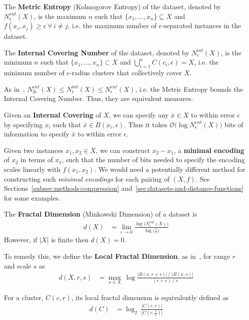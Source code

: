 The \textbf{Metric Entropy} (Kolmogorov Entropy) of the dataset, denoted by $N_{\epsilon}^{ent}(X)$, is the maximum $n$ such that $\{x_1, \dots, x_n\} \subseteq X$ and $f(x_i, x_j) \geq \epsilon \ \forall \ i \neq j$, i.e. the maximum number of $\epsilon$-separated instances in the dataset.

The \textbf{Internal Covering Number} of the dataset, denoted by $N_{\epsilon}^{int}(X)$, is the minimum $n$ such that $\{x_1, \dots, x_n\} \subset X$ and $\bigcup_{i = 1}^{n} C(c_i, \epsilon) = X$, i.e. the minimum number of $\epsilon$-radius clusters that collectively cover $X$.

As in~\cite{berger2020levenshtein}, $N_{2\epsilon}^{ent}(X) \leq N_{\epsilon}^{int}(X) \leq N_{\epsilon}^{ent}(X)$, i.e. the Metric Entropy bounds the Internal Covering Number.
Thus, they are equivalent measures.

Given an \textbf{Internal Covering} of $X$, we can specify any $\bar{x} \in X$ to within error $\epsilon$ by specifying $x_i$ such that $\bar{x} \in B(x_i, \epsilon)$.
Thus it takes $\mathcal{O} \big( \log N_{\epsilon}^{ent}(X) \big)$ bits of information to specify $\bar{x}$ to within error $\epsilon$.

Given two instances $x_1, x_2 \in X$, we can construct $x_2 - x_1$, a \textbf{minimal encoding} of $x_2$ in terms of $x_1$, such that the number of bits needed to specify the encoding scales linearly with $f(x_1, x_2)$.
We would need a potentially different method for constructing such \textit{minimal encodings} for each pairing of $(X, f)$.
See Sections~\ref{subsec:methods:compression} and~\ref{sec:datasets-and-distance-functions} for some examples.

The \textbf{Fractal Dimension} (Minkowski Dimension) of a dataset is
\begin{align*}
    d(X) &= \lim_{\epsilon \rightarrow 0} \frac{\log \big( N_{\epsilon}^{ent}(X) \big) }{\log \big( \frac{1}{\epsilon} \big)}
\end{align*}
However, if $|X|$ is finite then $d(X) = 0$.

To remedy this, we define the \textbf{Local Fractal Dimension}, as in~\cite{berger2020levenshtein}, for range $r$ and scale $s$ as
\begin{align*}
    d(X, r, s) &= \max_{x \in X} \ \log \frac{|B(x, r + s)| \ / \ |B(x, s)|}{(r + s) \ / \ s}
\end{align*}

For a cluster, $C(c, r)$, its local fractal dimension is equivalently defined as
\begin{align}
    \label{eq:local-fractal-dimension}
    d(C) &= \log_2 \ \frac{|C(c, r)|}{|C(c, \frac{r}{2})|}
\end{align}

